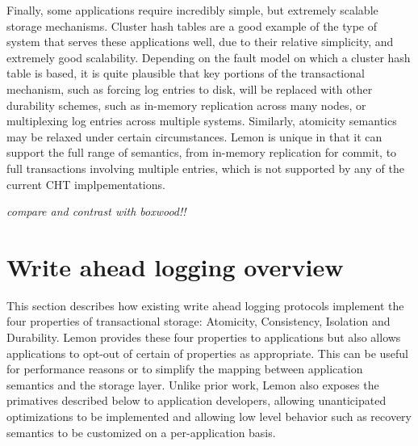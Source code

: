 \documentclass[letterpaper,twocolumn,english]{article}
\newcommand{\yad}{Lemon\xspace}
\begin{document}

Finally, some applications require incredibly simple, but extremely
scalable storage mechanisms.  Cluster hash tables are a good example
of the type of system that serves these applications well, due to
their relative simplicity, and extremely good scalability.  Depending
on the fault model on which a cluster hash table is based, it is
quite plausible that key portions of the transactional mechanism, such
as forcing log entries to disk, will be replaced with other durability
schemes, such as in-memory replication across many nodes, or
multiplexing log entries across multiple systems.  Similarly,
atomicity semantics may be relaxed under certain circumstances.  \yad is unique in that it can support the full range of semantics, from in-memory replication for commit, to full transactions involving multiple entries, which is not supported by any of the current CHT implpementations.

{\em compare and contrast with boxwood!!}

%


\section{Write ahead logging overview}

This section describes how existing write ahead logging protocols
implement the four properties of transactional storage: Atomicity,
Consistency, Isolation and Durability.  \yad provides these four
properties to applications but also allows applications to opt-out of
certain of properties as appropriate.  This can be useful for
performance reasons or to simplify the mapping between application
semantics and the storage layer.  Unlike prior work, \yad also
exposes the primatives described below to application developers,
allowing unanticipated optimizations to be implemented and allowing
low level behavior such as recovery semantics to be customized on a
per-application basis.
\end{document}
